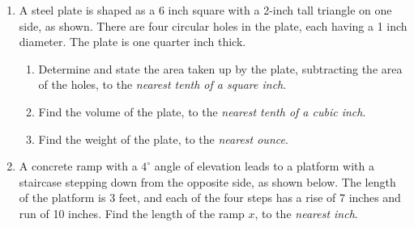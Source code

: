 \documentclass[12pt, twoside]{article}
\begin{document}
\begin{enumerate}
    \item A steel plate is shaped as a 6 inch square with a 2-inch tall triangle on one side, as shown. There are four circular holes in the plate, each having a 1 inch diameter. The plate is one quarter inch thick.
    \begin{enumerate}
      \item Determine and state the area taken up by the plate, subtracting the area of the holes, to the \emph{nearest tenth of a square inch}.\\[1.5cm]
         \vspace{1cm}
      \item Find the volume of the plate, to the \emph{nearest tenth of a cubic inch}. \vspace{2cm}
      \item Find the weight of the plate, to the \emph{nearest ounce}.
    \end{enumerate} \vspace{1.5cm}



\newpage
\item A concrete ramp with a $4^\circ$ angle of elevation leads to a platform with a staircase stepping down from the opposite side, as shown below. The length of the platform is 3 feet, and each of the four steps has a rise of 7 inches and run of 10 inches. Find the length of the ramp $x$, to the \emph{nearest inch}.\\[0.25cm]
       \vspace{5cm}


\end{enumerate}
\end{document}
